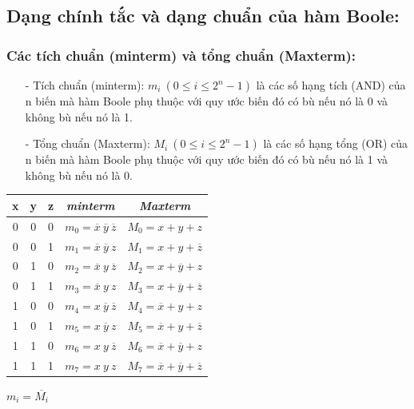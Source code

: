 \subsection{Dạng chính tắc và dạng chuẩn của hàm Boole:}
\subsubsection{Các tích chuẩn (minterm) và tổng chuẩn (Maxterm):}
\begin{itemize}
    \item[-] Tích chuẩn (minterm): $m_i \ (0 \leq i \leq 2^n - 1)$ là các số hạng tích (AND) của n biến mà hàm Boole phụ thuộc với quy ước biến đó có bù nếu nó là 0 và không bù nếu nó là 1.
    \item[-] Tổng chuẩn (Maxterm): $M_i \ (0 \leq i \leq 2^n - 1)$ là các số hạng tổng (OR) của n biến mà hàm Boole phụ thuộc với quy ước biến đó có bù nếu nó là 1 và không bù nếu nó là 0.
\end{itemize}
\begin{table}[h!]
    \centering
    \begin{tabular}{|ccc|c|c|}
    \hline
    \textbf{x} & \textbf{y} & \textbf{z} & \textit{\textbf{minterm}} & \textit{\textbf{Maxterm}} \\ \hline
    0 & 0 & 0 & $m_0 = \overline{x}\ \overline{y}\ \overline{z}$ & $M_0 = x+y+z$ \\
    0 & 0 & 1 & $m_1 = \overline{x}\ \overline{y}\ z$            & $M_1 = x+y+\overline{z}$ \\
    0 & 1 & 0 & $m_2 = \overline{x}\ y\ \overline{z}$            & $M_2 = x+\overline{y}+z$ \\
    0 & 1 & 1 & $m_3 = \overline{x}\ y\ z$                       & $M_3 = x+\overline{y}+\overline{z}$ \\
    1 & 0 & 0 & $m_4 = x\ \overline{y}\ \overline{z}$            & $M_4 = \overline{x}+y+z$ \\
    1 & 0 & 1 & $m_5 = x\ \overline{y}\ z$                       & $M_5 = \overline{x}+y+\overline{z}$ \\
    1 & 1 & 0 & $m_6 = x\ y\ \overline{z}$                       & $M_6 = \overline{x}+\overline{y}+z$ \\
    1 & 1 & 1 & $m_7 = x\ y\ z$                                  & $M_7 = \overline{x} + \overline{y} + \overline{z}$ \\ \hline
    \end{tabular}
    \qquad \qquad $m_i = \overline{M_i}$
\end{table}
\newpage
